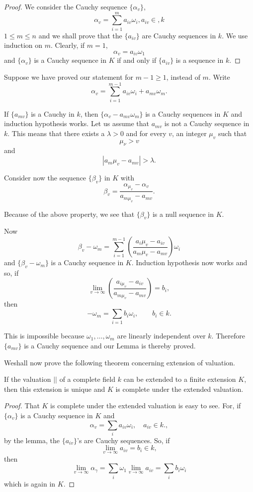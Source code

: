 \begin{proof}
We consider the Cauchy sequence $\{ \alpha _v \}$, 
$$
\alpha _v = \sum_ { i = 1}^m a_{iv} \omega_i , a_{iv} \in , k 
$$
$1 \leq m \leq n$ and we shall prove that the $\{ a_{iv}\}$ are Cauchy
sequences in $k$. We use induction on $m$. Clearly, if $m = 1$,  
$$
\alpha _v = a_{ i v} \omega_1 
$$
and $\{ \alpha_v\}$ is a Cauchy sequence in $K$ if and only if $\{
a_{iv}\}$ is a sequence in $k$. 
\end{proof}

Suppose we have proved our statement for $m - 1 \geq 1$, instead of
$m$. Write  
$$
\alpha _v = \sum_{i =1}^{m -1} a_{iv}\omega_i + a_{mv} \omega_m . 
$$

If $\{a_{mv}\}$ is a Cauchy in $k$, then $\{ \alpha_v - a_{mv}
\omega_m \}$ is a Cauchy sequences in $K$ and induction hypothesis
works. Let us assume that $a_{mv}$ is not a Cauchy sequence in
$k$. This means that there exists a $\lambda >0$ and for every $v$, an
integer $\mu_v$ such that  
$$
\mu_\nu > v 
$$
and 
$$
| a_m \mu _v - a_{mv} | > \lambda . 
$$

Consider now the sequence $\{ \beta _v\}$ in $K$ with 
$$
\beta_v = \frac{\alpha_{\mu_v}- \alpha_v }{ a_{m \mu_v} - a_{m v}}.
$$

Because of the above property, we see that $\{\beta _v\}$ is a null
sequence in $K$.  

Now 
$$
\beta_v - \omega_m = \sum^{m-1}_{ i = 1} \left(\frac{a_i \mu _v -
  a_{iv}}{a_m \mu _v - a_{mv}}\right )\omega_i 
$$\pageoriginale
and $\{\beta _v - \omega_m \}$  is a Cauchy sequence in
$K$. Induction hypothesis now works and so, if  
$$
\lim_{v \to \infty} \left(\frac{a_{i \mu_v} - a_{iv}}{a_{m\mu_v} -
  a_{mv}} \right)=b_i, 
$$
then
$$
- \omega_m = \sum_{i = 1} b_i \omega_i,\qquad b_i \in k.
$$

This is impossible because $\omega_1, \ldots , \omega_m$ are linearly
independent over $k$. Therefore $\{ a_{ m v}\}$ is a Cauchy sequence
and our Lemma is thereby proved.  

We\pageoriginale shall now prove the following theorem concerning
extension of valuation. 
 
\begin{thm}\label{chap8:thm4} %
 If the valuation $||$ of a complete field $k$ can be extended to
  a finite extension $K$, then this extension is unique and $K$ is
 complete under the extended valuation. 
\end{thm}


\begin{proof}
That $K$ is complete under the extended valuation is easy to see. For,
if $\{ \alpha _v\}$ is a Cauchy sequence in $K$ and  
$$
\alpha _ v = \sum_ i a_{iv} \omega _i ,\quad a_{iv} \in k .,
$$
by the lemma, the $\{a_{iv} \}$'s are Cauchy sequences. So, if 
$$
\lim_{ v \to \infty} a_{iv} = b_i \in k , 
$$
then 
$$
\lim_{ v\to \infty} \alpha_{\gamma} = \sum_i \omega_1 \lim_{ v \to \infty}
a_{iv} = \sum_i b_i \omega_i  
$$
which is again in $K$. 
\end{proof}

